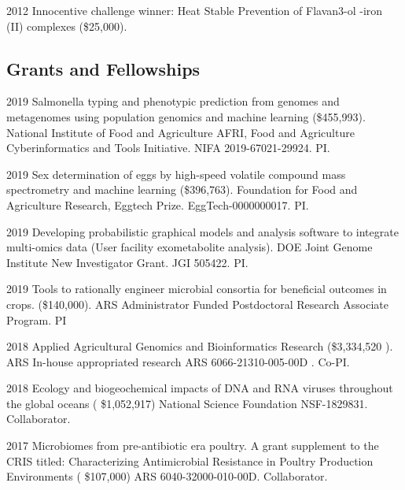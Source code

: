 \documentclass[12pt,letterpaper]{report}
\begin{document}
    \begin{tablist}

    	\item[2012] \tab Innocentive challenge winner: Heat Stable Prevention of  Flavan3-ol -iron (II) complexes (\$25,000).

    \end{tablist}

    \subsection*{Grants and Fellowships}

    \begin{tablist}

        \item[2019] \tab  Salmonella typing and phenotypic prediction from genomes and metagenomes using population genomics and machine learning (\$455,993).  National Institute of Food and Agriculture AFRI, Food and Agriculture Cyberinformatics and Tools Initiative. NIFA 2019-67021-29924.  PI.
        
        \item[2019]\tab  Sex determination of eggs by high-speed volatile compound mass spectrometry and machine learning  (\$396,763).  Foundation for Food and Agriculture Research, Eggtech Prize.  EggTech-0000000017. PI.
        
        \item[2019] \tab  Developing probabilistic graphical models and analysis software to integrate multi-omics data (User facility exometabolite analysis). DOE Joint Genome Institute New Investigator Grant. JGI 505422. PI.
        
        \item[2019] \tab Tools to rationally engineer microbial consortia for beneficial outcomes in crops. (\$140,000). ARS Administrator Funded Postdoctoral Research Associate Program. PI
        \item[2018] \tab  Applied Agricultural Genomics and Bioinformatics Research  (\$3,334,520 ). ARS In-house appropriated research ARS 6066-21310-005-00D . Co-PI.
        \item[2018] \tab Ecology and biogeochemical impacts of DNA and RNA viruses throughout the global  oceans ( \$1,052,917)  National Science Foundation NSF-1829831. Collaborator.
        \item[2017] \tab Microbiomes from pre-antibiotic era poultry. A grant supplement to the CRIS titled: Characterizing Antimicrobial Resistance in Poultry Production Environments  ( \$107,000)  ARS 6040-32000-010-00D. Collaborator.

        
              
        
       \end{tablist} 
        
\end{document}
